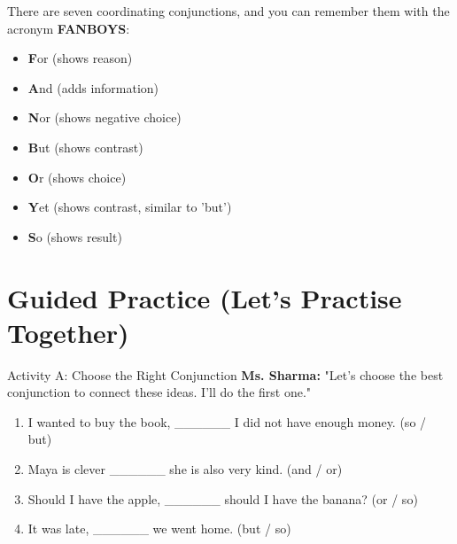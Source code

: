 There are seven coordinating conjunctions, and you can remember them with the acronym \textbf{FANBOYS}:

\begin{itemize}
    \item \textbf{F}or (shows reason)
    \item \textbf{A}nd (adds information)
    \item \textbf{N}or (shows negative choice)
    \item \textbf{B}ut (shows contrast)
    \item \textbf{O}r (shows choice)
    \item \textbf{Y}et (shows contrast, similar to 'but')
    \item \textbf{S}o (shows result)
\end{itemize}

\section{Guided Practice (Let's Practise Together)}
\begin{activitybox}{Activity A: Choose the Right Conjunction}
\textbf{Ms. Sharma:} "Let's choose the best conjunction to connect these ideas. I'll do the first one."
\begin{enumerate}
    \item I wanted to buy the book, \_\_\_\_\_\_ I did not have enough money. (so / but)
    \item Maya is clever \_\_\_\_\_\_ she is also very kind. (and / or)
    \item Should I have the apple, \_\_\_\_\_\_ should I have the banana? (or / so)
    \item It was late, \_\_\_\_\_\_ we went home. (but / so)
\end{enumerate}
\end{activitybox}


